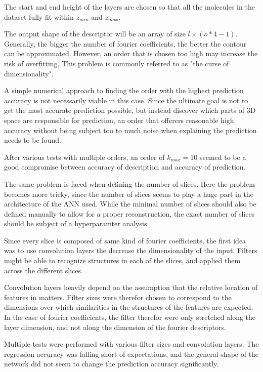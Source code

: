 The start and end height of the layers are chosen so that all the molecules in the dataset fully fit within $z_{min}$ and $z_{max}$.

The output shape of the descriptor will be an array of size $l \times (o * 4 - 1)$.
Generally, the bigger the number of fourier coefficients, the better the contour can be approximated.
However, an order that is chosen too high may increase the risk of overfitting, 
This problem is commonly referred to as "the curse of dimensionality".

A simple numerical approach to finding the order with the highest prediction accuracy is not necessarily viable in this case.
Since the ultimate goal is not to get the most accurate prediction possible, but instead discover which parts of 3D space 
are responsible for prediction, an order that offerers reasonable high accuracy without being subject too to much noise when explaining the 
prediction needs to be found. %

After various tests with multiple orders, an order of $k_{max} = 10$ seemed to be a good compromise between accuracy of description and accuracy of prediction.

The same problem is faced when defining the number of slices.
Here the problem becomes more tricky, since the number of slices seems to play a huge part in the architecture of the ANN used.
While the minimal number of slices should also be defined manually to allow for a proper reconstruction, the exact number of slices should be subject of a hyperparamter analysis.


Since every slice is composed of same kind of fourier coefficients, the first idea was to use convolution layers the decrease the dimensionality of the input.
Filters might be able to recognize structures in each of the slices, and applied them across the different slices.

Convolution layers heavily depend on the assumption that the relative location of features in matters.
Filter sizes were therefor chosen to correspond to the dimensions over which similarities in the structures of the features are expected.
In the case of fourier coefficients, the filter therefor were only stretched along the layer dimension, and not along the dimension of the fourier descriptors.

Multiple tests were performed with various filter sizes and convolution layers.
The regression accuracy was falling short of expectations, and the general shape of the network did not seem to change the prediction accuracy significantly.

